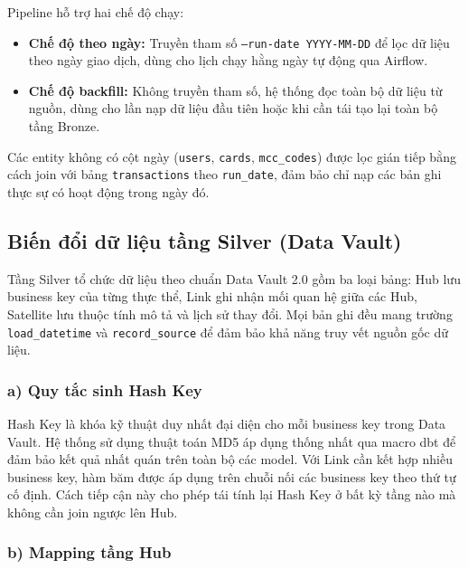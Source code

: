 Pipeline hỗ trợ hai chế độ chạy:

\begin{itemize}
    \item \textbf{Chế độ theo ngày:} Truyền tham số \texttt{--run-date
          YYYY-MM-DD} để lọc dữ liệu theo ngày giao dịch, dùng cho lịch
          chạy hằng ngày tự động qua Airflow.
    \item \textbf{Chế độ backfill:} Không truyền tham số, hệ thống đọc
          toàn bộ dữ liệu từ nguồn, dùng cho lần nạp dữ liệu đầu tiên
          hoặc khi cần tái tạo lại toàn bộ tầng Bronze.
\end{itemize}

Các entity không có cột ngày (\texttt{users}, \texttt{cards},
\texttt{mcc\_codes}) được lọc gián tiếp bằng cách join với bảng
\texttt{transactions} theo \texttt{run\_date}, đảm bảo chỉ nạp các bản
ghi thực sự có hoạt động trong ngày đó.


\subsection{Biến đổi dữ liệu tầng Silver (Data Vault)}

Tầng Silver tổ chức dữ liệu theo chuẩn Data Vault 2.0 gồm ba loại bảng:
Hub lưu business key của từng thực thể, Link ghi nhận mối quan hệ giữa
các Hub, Satellite lưu thuộc tính mô tả và lịch sử thay đổi. Mọi bản ghi
đều mang trường \texttt{load\_datetime} và \texttt{record\_source} để đảm
bảo khả năng truy vết nguồn gốc dữ liệu.

\subsubsection*{a) Quy tắc sinh Hash Key}

Hash Key là khóa kỹ thuật duy nhất đại diện cho mỗi business key trong
Data Vault. Hệ thống sử dụng thuật toán MD5 áp dụng thống nhất qua macro
dbt để đảm bảo kết quả nhất quán trên toàn bộ các model. Với Link cần
kết hợp nhiều business key, hàm băm được áp dụng trên chuỗi nối các
business key theo thứ tự cố định. Cách tiếp cận này cho phép tái tính
lại Hash Key ở bất kỳ tầng nào mà không cần join ngược lên Hub.

\subsubsection*{b) Mapping tầng Hub}

